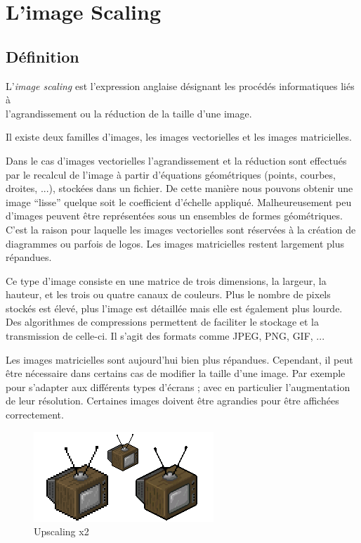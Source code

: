 \documentclass[12pt, a4paper]{article}
\begin{document}
\newpage

\section{L'image Scaling}

\subsection{Définition}
L'\textit{image scaling} est l'expression anglaise désignant les procédés informatiques liés à \\
l'agrandissement ou la réduction de la taille d'une image.

Il existe deux familles d'images, les images vectorielles et les images matricielles.

Dans le cas d'images vectorielles l'agrandissement et la réduction sont effectués par le recalcul de l'image à partir d'équations géométriques (points, courbes, droites, ...), stockées dans un fichier. De cette manière nous pouvons obtenir une image ``lisse'' quelque soit le coefficient d'échelle appliqué. Malheureusement peu d'images peuvent être représentées sous un ensembles de formes géométriques. C'est la raison pour laquelle les images vectorielles sont réservées à la création de diagrammes ou parfois de logos. Les images matricielles restent largement plus répandues.

Ce type d'image consiste en une matrice de trois dimensions, la largeur, la hauteur, et les trois ou quatre canaux de couleurs. Plus le nombre de pixels stockés est élevé, plus l'image est détaillée mais elle est également plus lourde. Des algorithmes de compressions permettent de faciliter le stockage et la transmission de celle-ci. Il s'agit des formats comme JPEG, PNG, GIF, ...

Les images matricielles sont aujourd'hui bien plus répandues. Cependant, il peut être nécessaire dans certains cas de modifier la taille d'une image. Par exemple pour s'adapter aux différents types d'écrans ; avec en particulier l'augmentation de leur résolution. Certaines images doivent être agrandies pour être affichées correctement.

\begin{figure}[h!]
  \centering
  \includegraphics[scale=0.7]{Images/tele.png}
  \caption{Upscaling x2}
\end{figure}
\end{document}
